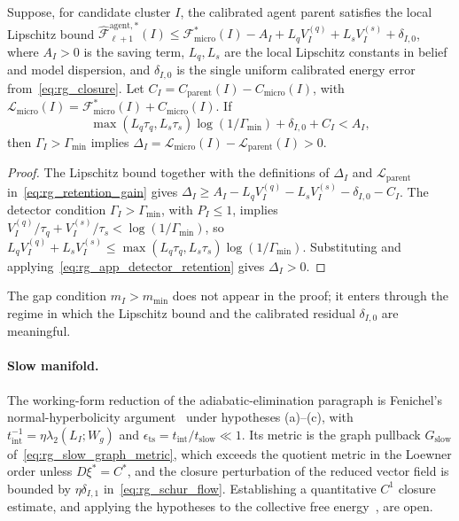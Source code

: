 \begin{theorem}
\label{thm:rg_detector_retention}
Suppose, for candidate cluster $I$, the calibrated agent parent satisfies the local Lipschitz bound $\widehat{\mathcal{F}}_{\ell+1}^{\mathrm{agent},*}(I) \le \mathcal{F}_{\mathrm{micro}}^*(I) - A_I + L_q V_I^{(q)} + L_s V_I^{(s)} + \delta_{I,0}$, where $A_I > 0$ is the saving term, $L_q, L_s$ are the local Lipschitz constants in belief and model dispersion, and $\delta_{I,0}$ is the single uniform calibrated energy error from~\eqref{eq:rg_closure}. Let $C_I = C_{\mathrm{parent}}(I) - C_{\mathrm{micro}}(I)$, with $\mathcal{L}_{\mathrm{micro}}(I) = \mathcal{F}_{\mathrm{micro}}^*(I) + C_{\mathrm{micro}}(I)$. If
\begin{equation}
\max(L_q\tau_q, L_s\tau_s)\log(1/\Gamma_{\min}) + \delta_{I,0} + C_I < A_I,
\label{eq:rg_app_detector_retention}
\end{equation}
then $\Gamma_I > \Gamma_{\min}$ implies $\Delta_I = \mathcal{L}_{\mathrm{micro}}(I) - \mathcal{L}_{\mathrm{parent}}(I) > 0$.
\end{theorem}

\begin{proof}
The Lipschitz bound together with the definitions of $\Delta_I$ and $\mathcal{L}_{\mathrm{parent}}$ in~\eqref{eq:rg_retention_gain} gives $\Delta_I \ge A_I - L_q V_I^{(q)} - L_s V_I^{(s)} - \delta_{I,0} - C_I$. The detector condition $\Gamma_I > \Gamma_{\min}$, with $P_I \le 1$, implies $V_I^{(q)}/\tau_q + V_I^{(s)}/\tau_s < \log(1/\Gamma_{\min})$, so $L_q V_I^{(q)} + L_s V_I^{(s)} \le \max(L_q\tau_q, L_s\tau_s)\log(1/\Gamma_{\min})$. Substituting and applying~\eqref{eq:rg_app_detector_retention} gives $\Delta_I > 0$.
\end{proof}

The gap condition $m_I>m_{\min}$ does not appear in the proof; it enters through the regime in which the Lipschitz bound and the calibrated residual $\delta_{I,0}$ are meaningful.

\paragraph{Slow manifold.}
The working-form reduction of the adiabatic-elimination paragraph is Fenichel's normal-hyperbolicity argument~\cite{fenichel1979geometric} under hypotheses (a)--(c), with $t_{\mathrm{int}}^{-1}=\eta\lambda_2(L_I;W_g)$ and $\epsilon_{\mathrm{ts}}=t_{\mathrm{int}}/t_{\mathrm{slow}}\ll1$. Its metric is the graph pullback $G_{\mathrm{slow}}$ of~\eqref{eq:rg_slow_graph_metric}, which exceeds the quotient metric in the Loewner order unless $D\xi^*=C^*$, and the closure perturbation of the reduced vector field is bounded by $\eta\delta_{I,1}$ in~\eqref{eq:rg_schur_flow}. Establishing a quantitative $C^1$ closure estimate, and applying the hypotheses to the collective free energy~\cite[Ch.~8]{DennisGaugeVFE2026}, are open.

